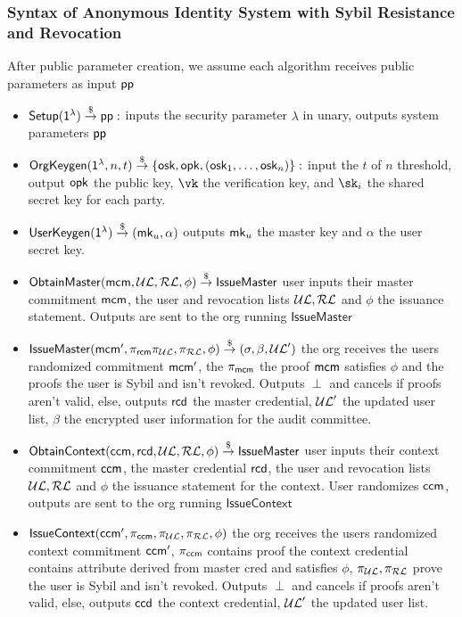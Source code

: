\subsubsection{Syntax of Anonymous Identity System with Sybil Resistance and Revocation}
After public parameter creation, we assume each algorithm receives public parameters as input $\mathsf{pp}$ 
\begin{itemize}

    \item $\mathsf{Setup}(\mathsf{1^{\lambda}}) \stackrel{\$}{\to} \mathsf{pp}:$ inputs the security parameter $\lambda$ in unary, outputs system parameters $\mathsf{pp}$

    \item $\mathsf{OrgKeygen}(\mathsf{1^{\lambda}}, n, t) \stackrel{\$}{\to} \{\mathsf{osk}, \mathsf{opk}, (\mathsf{osk}_1, \dots, \mathsf{osk}_n)\}:$ input the $t$ of $n$ threshold, output $\mathsf{opk}$ the public key, $\vk$ the verification key, and $\sk_i$ the shared secret key for each party.

    \item $\mathsf{UserKeygen}(\mathsf{1^{\lambda}}) \stackrel{\$}{\to} (\mathsf{mk}_u, \alpha)$ outputs $\mathsf{mk}_u$ the master key and $\alpha$ the user secret key. 

    \item $\mathsf{ObtainMaster}(\mathsf{mcm}, \mathcal{UL}, \mathcal{RL}, \phi) \stackrel{\$}{\to} \mathsf{IssueMaster}$ user inputs their master commitment $\mathsf{mcm}$, the user and revocation lists $\mathcal{UL}, \mathcal{RL}$ and $\phi$ the issuance statement. Outputs are sent to the org running $\mathsf{IssueMaster}$
    
    \item $\mathsf{IssueMaster}(\mathsf{mcm}', \pi_{\mathsf{rcm}} \pi_{\mathcal{UL}}, \pi_{\mathcal{RL}}, \phi) \stackrel{\$}{\to} (\sigma, \beta, \mathcal{UL}')$ the org receives the users randomized commitment $\mathsf{mcm}'$, the $\pi_{\mathsf{mcm}}$ the proof $\mathsf{mcm}$ satisfies $\phi$ and the proofs the user is Sybil and isn't revoked. Outputs $\perp$ and cancels if proofs aren't valid, else, outputs $\mathsf{rcd}$ the master credential, $\mathcal{UL}'$ the updated user list, $\beta$ the encrypted user information for the audit committee.

    \item $\mathsf{ObtainContext}(\mathsf{ccm}, \mathsf{rcd}, \mathcal{UL}, \mathcal{RL}, \phi) \stackrel{\$}{\to} \mathsf{IssueMaster}$ user inputs their context commitment $\mathsf{ccm}$, the master credential $\mathsf{rcd}$, the user and revocation lists $\mathcal{UL}, \mathcal{RL}$ and $\phi$ the issuance statement for the context. User randomizes $\mathsf{ccm}$, outputs are sent to the org running $\mathsf{IssueContext}$
    
    \item $\mathsf{IssueContext}(\mathsf{ccm}', \pi_{\mathsf{ccm}}, \pi_{\mathcal{UL}}, \pi_{\mathcal{RL}}, \phi)$ 
    the org receives the users randomized context commitment $\mathsf{ccm}'$, $\pi_{\mathsf{ccm}}$ contains proof the context credential contains attribute derived from master cred and satisfies $\phi$, $\pi_{\mathcal{UL}}, \pi_{\mathcal{RL}}$ prove the user is Sybil and isn't revoked. Outputs $\perp$ and cancels if proofs aren't valid, else, outputs $\mathsf{ccd}$ the context credential, $\mathcal{UL}'$ the updated user list.


\end{itemize}
